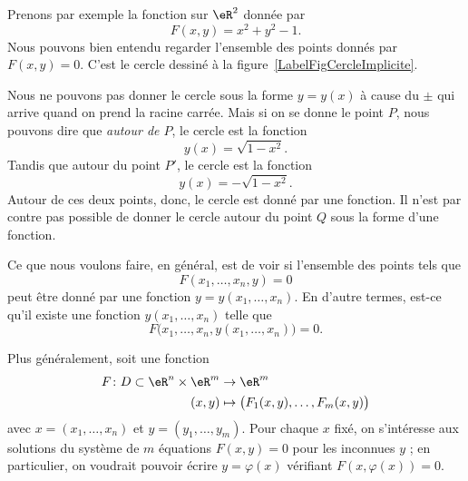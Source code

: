 Prenons par exemple la fonction sur \( \eR^2\) donnée par
\begin{equation}
	F(x,y)=x^2+y^2-1.
\end{equation}
Nous pouvons bien entendu regarder l'ensemble des points donnés par \( F(x,y)=0\). C'est le cercle dessiné à la figure~\ref{LabelFigCercleImplicite}.
\newcommand{\CaptionFigCercleImplicite}{Un cercle pour montrer l'intérêt de la fonction implicite. Si on donne \( x\), nous ne pouvons pas savoir si nous parlons de \( P\) ou de \( P'\).}


%

Nous ne pouvons pas donner le cercle sous la forme \( y=y(x)\) à cause du \( \pm\) qui arrive quand on prend la racine carrée. Mais si on se donne le point \( P\), nous pouvons dire que \emph{autour de \( P\)}, le cercle est la fonction
\begin{equation}
	y(x)=\sqrt{1-x^2}.
\end{equation}
Tandis que autour du point \( P'\), le cercle est la fonction
\begin{equation}
	y(x)=-\sqrt{1-x^2}.
\end{equation}
Autour de ces deux points, donc, le cercle est donné par une fonction. Il n'est par contre pas possible de donner le cercle autour du point \( Q\) sous la forme d'une fonction.

Ce que nous voulons faire, en général, est de voir si l'ensemble des points tels que
\begin{equation}
	F(x_1,\ldots,x_n,y)=0
\end{equation}
peut être donné par une fonction \( y=y(x_1,\ldots,x_n)\). En d'autre termes, est-ce qu'il existe une fonction \( y(x_1,\ldots,x_n)\) telle que
\begin{equation}
	F\big( x_1,\ldots,x_n,y(x_1,\ldots,x_n)\big)=0.
\end{equation}

Plus généralement, soit une fonction
\begin{equation}
	\begin{aligned}
		F\colon D\subset \eR^n\times \eR^m & \to \eR^m                                     \\
		(x,y)                              & \mapsto \big( F_1(x,y),\ldots, F_m(x,y) \big)
	\end{aligned}
\end{equation}
avec \( x = (x_1,\ldots, x_n)\) et \( y = (y_1,\ldots,y_m)\). Pour chaque \( x\) fixé, on s'intéresse aux solutions du système de \( m\) équations \( F(x,y) = 0\) pour les inconnues \( y\) ; en particulier, on voudrait pouvoir écrire \( y = \varphi(x)\) vérifiant \( F(x,\varphi(x)) = 0\).

